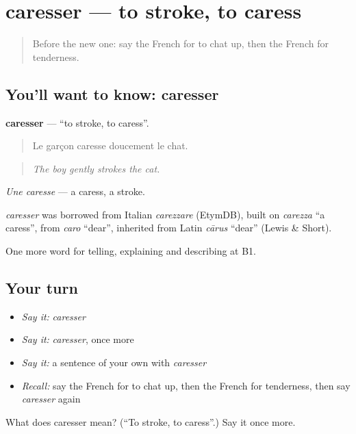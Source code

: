 \section[caresser]{caresser — to stroke, to caress}

\label{lesson:FR-C487-caresser}



\begin{quote}
Before the new one: say the French for to chat up, then the French for tenderness.
\end{quote}

\subsection*{You'll want to know: caresser}
\textbf{caresser} — \textquotedblleft{}to stroke, to caress\textquotedblright{}.

\begin{quote}
Le garçon caresse doucement le chat.
\end{quote}

\begin{quote}
\emph{The boy gently strokes the cat.}
\end{quote}

\emph{Une caresse} — a caress, a stroke.

\begin{cousinweb}
\emph{caresser} was borrowed from Italian \emph{carezzare} (EtymDB), built on \emph{carezza} \textquotedblleft{}a caress\textquotedblright{}, from \emph{caro} \textquotedblleft{}dear\textquotedblright{}, inherited from Latin \emph{cārus} \textquotedblleft{}dear\textquotedblright{} (Lewis \& Short).
\end{cousinweb}

\begin{grammarlens}[title={What you've built}]
One more word for telling, explaining and describing at B1.
\end{grammarlens}

\subsection*{Your turn}
\begin{itemize}
\raggedright
  \item \emph{Say it:} \emph{caresser}
  \item \emph{Say it:} \emph{caresser}, once more
  \item \emph{Say it:} a sentence of your own with \emph{caresser}
  \item \emph{Recall:} say the French for to chat up, then the French for tenderness, then say \emph{caresser} again
\end{itemize}

\begin{tcolorbox}[breakable,colback=teal!4,colframe=teal!35!black,title={Before you move on}]
What does caresser mean? (\textquotedblleft{}To stroke, to caress\textquotedblright{}.) Say it once more.
\end{tcolorbox}
